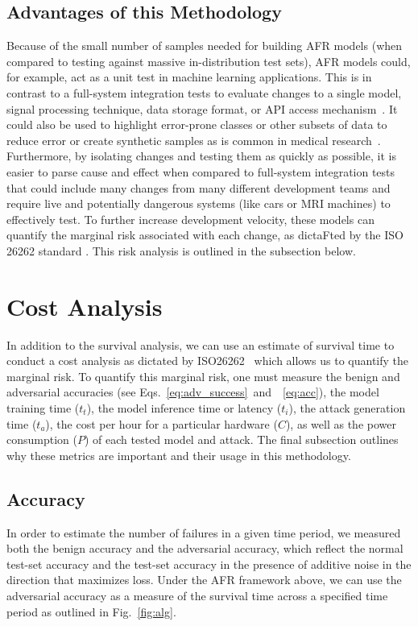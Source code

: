\documentclass[journal]{IEEEtran}
\begin{document}
\subsection{Advantages of this Methodology}
\label{advantages}
Because of the small number of samples needed for building AFR models (when compared to testing against massive in-distribution test sets), AFR models could, for example, act as a unit test in machine learning applications. This is in contrast to a full-system integration tests to evaluate changes to a single model, signal processing technique, data storage format, or API access mechanism~\cite{schmoor2000sample,lachin1981introduction}. It could also be used to highlight error-prone classes or other subsets of data to reduce error or create synthetic samples as is common in medical research~\cite{kleinbaum1996survival}. Furthermore, by isolating changes and testing them as quickly as possible, it is  easier to parse cause and effect when compared to full-system integration tests that could include many changes from many different development teams and require live and potentially dangerous systems (like cars or MRI machines) to effectively test. To further increase development velocity, these models can quantify the marginal risk associated with each change, as dictaFted by the ISO 26262 standard \cite{iso26262}. This risk analysis is outlined in the subsection below.

\section{Cost Analysis}
\label{cost}
In addition to the survival analysis, we can use an estimate of survival time to conduct a cost analysis as dictated by ISO26262~\cite{iso26262} which allows us to quantify the marginal risk. To quantify this marginal risk, one must measure the benign and adversarial accuracies (see Eqs.~\ref{eq:adv_success}~and~~\ref{eq:acc}), the model training time ($t_{t}$), the model inference time or latency ($t_{i}$), the attack generation time ($t_{a}$), the cost per hour for a particular hardware ($C$), as well as the power consumption ($P$) of each tested model and attack. The final subsection outlines why these metrics are important and their usage in this methodology.

\subsection{Accuracy}
In order to estimate the number of failures in a given time period, we measured both the benign accuracy and the adversarial accuracy, which reflect the normal test-set accuracy and the test-set accuracy in the presence of additive noise in the direction that maximizes loss. Under the AFR framework above, we can use the adversarial accuracy as a measure of the survival time across a specified time period as outlined in Fig.~\ref{fig:alg}.
\end{document}
